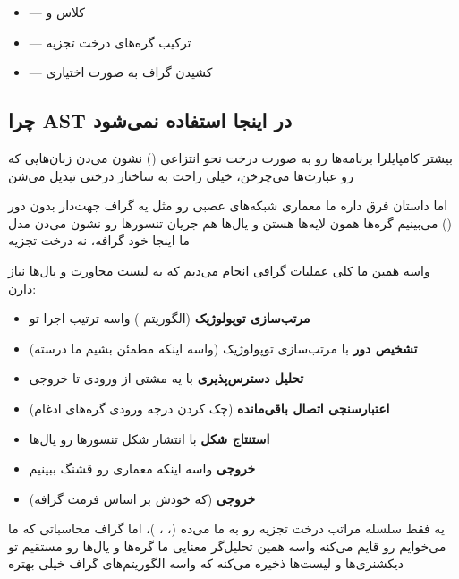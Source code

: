 \documentclass{nngraph-fa}
\begin{document}
\begin{itemize}
    \item {} --- کلاس  و 
    \item {} --- ترکیب گره‌های درخت تجزیه
    \item {} --- کشیدن گراف به صورت اختیاری
\end{itemize}

\subsection{چرا AST در اینجا استفاده نمی‌شود}

بیشتر کامپایلرا برنامه‌ها رو به صورت درخت نحو انتزاعی () نشون می‌دن
زبان‌هایی که رو عبارت‌ها می‌چرخن، خیلی راحت به ساختار درختی تبدیل می‌شن

اما داستان  فرق داره
ما معماری شبکه‌های عصبی رو مثل یه گراف جهت‌دار بدون دور () می‌بینیم
گره‌ها همون لایه‌ها هستن و یال‌ها هم جریان تنسورها رو نشون می‌دن
مدل ما اینجا خود گرافه، نه درخت تجزیه

واسه همین ما کلی عملیات گرافی انجام می‌دیم که به لیست مجاورت و یال‌ها نیاز دارن:

\begin{itemize}[noitemsep]
    \item \textbf{مرتب‌سازی توپولوژیک} (الگوریتم ) واسه ترتیب اجرا تو 
    \item \textbf{تشخیص دور} با مرتب‌سازی توپولوژیک (واسه اینکه مطمئن بشیم  ما درسته)
    \item \textbf{تحلیل دسترس‌پذیری} با یه  مشتی از ورودی تا خروجی
    \item \textbf{اعتبارسنجی اتصال باقی‌مانده} (چک کردن درجه ورودی گره‌های ادغام)
    \item \textbf{استنتاج شکل} با انتشار شکل تنسورها رو یال‌ها
    \item \textbf{خروجی } واسه اینکه معماری رو قشنگ ببینیم
    \item \textbf{خروجی } (که خودش بر اساس فرمت گرافه)
\end{itemize}

یه  فقط سلسله مراتب درخت تجزیه رو به ما می‌ده (، ، )، اما گراف محاسباتی که ما می‌خوایم رو قایم می‌کنه
واسه همین تحلیل‌گر معنایی ما گره‌ها و یال‌ها رو مستقیم تو دیکشنری‌ها و لیست‌ها ذخیره می‌کنه که واسه الگوریتم‌های گراف خیلی بهتره
\end{document}

